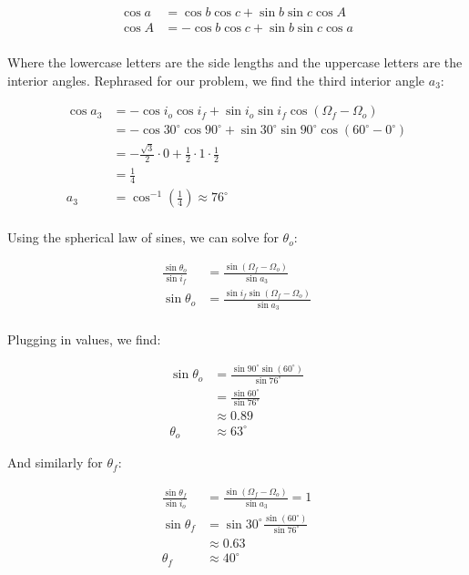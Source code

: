 \begin{align*}
    \cos a &= \cos b \cos c + \sin b \sin c \cos A \\
    \cos A &= - \cos b \cos c + \sin b \sin c \cos a \\
\end{align*}

Where the lowercase letters are the side lengths and the uppercase letters are the interior angles. Rephrased for our problem, we find the third interior angle $a_3$:

\begin{align*}
    \cos a_3 &= - \cos i_o \cos i_f + \sin i_o \sin i_f \cos(\Omega_f - \Omega_o) \\
    &= - \cos 30^\circ \cos 90^\circ + \sin 30^\circ \sin 90^\circ \cos(60^\circ - 0^\circ) \\
    &= - \frac{\sqrt{3}}{2} \cdot 0 + \frac{1}{2} \cdot 1 \cdot \frac{1}{2} \\
    &= \frac{1}{4} \\
    a_3 &= \cos^{-1} \left( \frac{1}{4} \right) \approx 76^\circ \\
\end{align*}

Using the spherical law of sines, we can solve for $\theta_o$:

\begin{align*}
    \frac{\sin\theta_o}{\sin i_f} &= \frac{\sin(\Omega_f - \Omega_o)}{\sin a_3} \\
    \sin\theta_o &= \frac{\sin i_f \sin(\Omega_f - \Omega_o)}{\sin a_3} \\
\end{align*}

Plugging in values, we find:

\begin{align*}
    \sin\theta_o &= \frac{\sin 90^\circ \sin(60^\circ)}{\sin 76^\circ} \\
    &= \frac{\sin 60^\circ}{\sin 76^\circ} \\
    &\approx 0.89 \\
    \theta_o &\approx 63^\circ
\end{align*}

And similarly for $\theta_f$:

\begin{align*}
    \frac{\sin\theta_f}{\sin i_o} &= \frac{\sin(\Omega_f - \Omega_o)}{\sin a_3} = 1 \\
    \sin\theta_f &= \sin 30^\circ \frac{\sin(60^\circ)}{\sin 76^\circ} \\
    &\approx 0.63 \\
    \theta_f &\approx 40^\circ
\end{align*}

